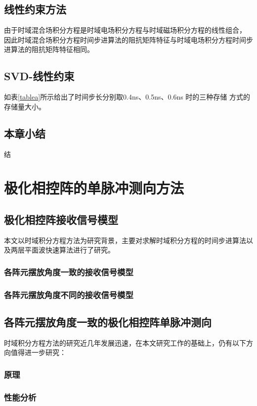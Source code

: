 \documentclass[master]{thesis-uestc}
\begin{document}
\section{线性约束方法}
由于时域混合场积分方程是时域电场积分方程与时域磁场积分方程的线性组合，
因此时域混合场积分方程时间步进算法的阻抗矩阵特征与时域电场积分方程时间步进算法的阻抗矩阵特征相同。

\section{SVD-线性约束}
如表\ref{tablea}所示给出了时间步长分别取0.4ns、0.5ns、0.6ns 时的三种存储
方式的存储量大小。

\section{本章小结}
结
\chapter{极化相控阵的单脉冲测向方法}

\section{极化相控阵接收信号模型}
本文以时域积分方程方法为研究背景，主要对求解时域积分方程的时间步进算法以及两层平面波快速算法进行了研究。
\subsection{各阵元摆放角度一致的接收信号模型}

\subsection{各阵元摆放角度不同的接收信号模型}

\section{各阵元摆放角度一致的极化相控阵单脉冲测向}
时域积分方程方法的研究近几年发展迅速，在本文研究工作的基础上，仍有以下方向值得进一步研究：

\subsection{原理}

\subsection{性能分析}
\end{document}
